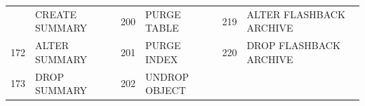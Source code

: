\begin{appendix}
\begin{longtable}[]{@{}rl|rl|rl@{}}
\begin{minipage}[t]{0.06\columnwidth}
\end{minipage} & \begin{minipage}[t]{0.19\columnwidth}\raggedright\strut
CREATE SUMMARY\strut
\end{minipage} & \begin{minipage}[t]{0.06\columnwidth}\raggedright\strut
200\strut
\end{minipage} & \begin{minipage}[t]{0.24\columnwidth}\raggedright\strut
PURGE TABLE\strut
\end{minipage} & \begin{minipage}[t]{0.06\columnwidth}\raggedright\strut
219\strut
\end{minipage} & \begin{minipage}[t]{0.24\columnwidth}\raggedright\strut
ALTER FLASHBACK ARCHIVE\strut
\end{minipage}\tabularnewline
\begin{minipage}[t]{0.06\columnwidth}\raggedright\strut
172\strut
\end{minipage} & \begin{minipage}[t]{0.19\columnwidth}\raggedright\strut
ALTER SUMMARY\strut
\end{minipage} & \begin{minipage}[t]{0.06\columnwidth}\raggedright\strut
201\strut
\end{minipage} & \begin{minipage}[t]{0.24\columnwidth}\raggedright\strut
PURGE INDEX\strut
\end{minipage} & \begin{minipage}[t]{0.06\columnwidth}\raggedright\strut
220\strut
\end{minipage} & \begin{minipage}[t]{0.24\columnwidth}\raggedright\strut
DROP FLASHBACK ARCHIVE\strut
\end{minipage}\tabularnewline
\begin{minipage}[t]{0.06\columnwidth}\raggedright\strut
173\strut
\end{minipage} & \begin{minipage}[t]{0.19\columnwidth}\raggedright\strut
DROP SUMMARY\strut
\end{minipage} & \begin{minipage}[t]{0.06\columnwidth}\raggedright\strut
202\strut
\end{minipage} & \begin{minipage}[t]{0.24\columnwidth}\raggedright\strut
UNDROP OBJECT\strut
\end{minipage} & \begin{minipage}[t]{0.06\columnwidth}\raggedright\strut

\end{minipage}
\end{longtable}
\end{appendix}
